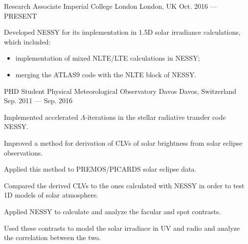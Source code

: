 

\begin{cventries}

  \cventry
    {Research Associate} %
    {Imperial College London} %
    {London, UK} %
    {Oct. 2016 --- PRESENT} %
    {
      \begin{cvitems} %
        \item {Developed NESSY for its implementation in 1.5D solar irradiance calculations, which included:}
            \begin{itemize}
                \item {implementation of mixed NLTE/LTE calculations in NESSY;}
                \item {merging the ATLAS9 code with the NLTE block of NESSY.}
            \end{itemize}
      \end{cvitems}
    }

  \cventry
    {PHD Student} %
    {Physical Meteorological Observatory Davos} %
    {Davos, Switzerland} %
    {Sep. 2011 --- Sep. 2016} %
    {
      \begin{cvitems} %
        \item {Implemented accelerated $\Lambda$-iterations in the stellar radiative transfer code NESSY.}
        \item {Improved a method for derivation of CLVs of solar brightness from solar eclipse observations.}
        \item {Applied this method to PREMOS/PICARDS solar eclipse data.}
        \item {Compared the derived CLVs to the ones calculated with NESSY in order to test 1D models of solar atmosphere.}
        \item {Applied NESSY to calculate and analyze the facular and spot contrasts.}
        \item {Used these contrasts to model the solar irradiace in UV and radio and analyze the correlation between the two.}
      \end{cvitems}
    }


\end{cventries}
